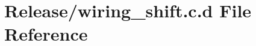 \hypertarget{_release_2wiring__shift_8c_8d}{\section{\-Release/wiring\-\_\-shift.c.\-d \-File \-Reference}
\label{_release_2wiring__shift_8c_8d}
}
